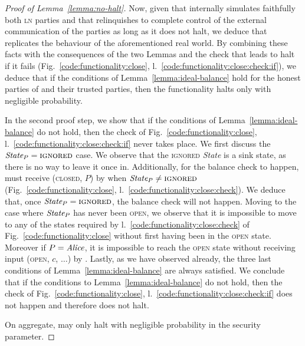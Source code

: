 \begin{proof}[Proof of Lemma~\ref{lemma:no-halt}]
  Now, given that \simulator internally simulates faithfully both \textsc{ln}
  parties and that \fchan relinquishes to \simulator complete control of the
  external communication of the parties as long as it does not halt, we deduce
  that \simulator replicates the behaviour of the aforementioned real world. By
  combining these facts with the consequences of the two Lemmas and the check
  that leads \fchan to halt if it fails (Fig.~\ref{code:functionality:close},
  l.~\ref{code:functionality:close:check:if}), we deduce that if the conditions
  of Lemma~\ref{lemma:ideal-balance} hold for the honest parties of \fchan and
  their trusted parties, then the functionality halts only with negligible
  probability.

  In the second proof step, we show that if the conditions of
  Lemma~\ref{lemma:ideal-balance} do not hold, then the check of
  Fig.~\ref{code:functionality:close},
  l.~\ref{code:functionality:close:check:if} never takes place. We first discuss
  the $\itistate_P = \textsc{ignored}$ case. We observe that the
  \textsc{ignored} \textit{State} is a sink state, as there is no way to leave
  it once in. Additionally, for the balance check to happen, \fchan must receive
  (\textsc{closed}, $P$) by \simulator when $\itistate_P \neq \textsc{ignored}$
  (Fig.~\ref{code:functionality:close},
  l.~\ref{code:functionality:close:check}). We deduce that, once $\itistate_P =
  \textsc{ignored}$, the balance check will not happen. Moving to the case where
  $\itistate_P$ has never been \textsc{open}, we observe that it is impossible
  to move to any of the states required by
  l.~\ref{code:functionality:close:check} of Fig.~\ref{code:functionality:close}
  without first having been in the \textsc{open} state. Moreover if $P =
  \mathit{Alice}$, it is impossible to reach the \textsc{open} state without receiving
  input (\textsc{open}, $c$, $\dots$) by \environment. Lastly, as we have
  observed already, the three last conditions of Lemma~\ref{lemma:ideal-balance}
  are always satisfied. We conclude that if the conditions to
  Lemma~\ref{lemma:ideal-balance} do not hold, then the check of
  Fig.~\ref{code:functionality:close},
  l.~\ref{code:functionality:close:check:if} does not happen and therefore
  \fchan does not halt.

  On aggregate, \fchan may only halt with negligible probability in the security
  parameter.
\end{proof}
